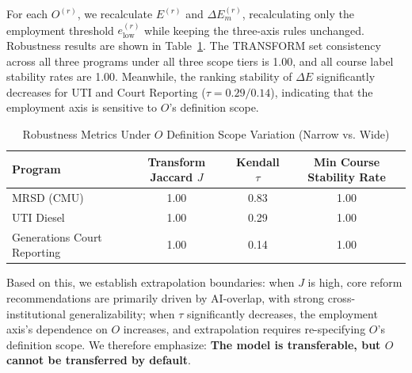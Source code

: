 For each $O^{(r)}$, we recalculate $E^{(r)}$ and $\Delta E_m^{(r)}$, recalculating only the employment threshold $e_{\mathrm{low}}^{(r)}$ while keeping the three-axis rules unchanged. Robustness results are shown in Table~\ref{tab:o_variants_robustness}. The TRANSFORM set consistency across all three programs under all three scope tiers is 1.00, and all course label stability rates are 1.00. Meanwhile, the ranking stability of $\Delta E$ significantly decreases for UTI and Court Reporting ($\tau=0.29/0.14$), indicating that the employment axis is sensitive to $O$'s definition scope.

\begin{table}[H]
\centering
\caption{Robustness Metrics Under $O$ Definition Scope Variation (Narrow vs. Wide)}
\label{tab:o_variants_robustness}
\begin{tabular}{@{}lccc@{}}
\toprule
Program & Transform Jaccard $J$ & Kendall $\tau$ & Min Course Stability Rate \\
\midrule
MRSD (CMU) & 1.00 & 0.83 & 1.00 \\
UTI Diesel & 1.00 & 0.29 & 1.00 \\
Generations Court Reporting & 1.00 & 0.14 & 1.00 \\
\bottomrule
\end{tabular}
\end{table}

Based on this, we establish extrapolation boundaries: when $J$ is high, core reform recommendations are primarily driven by AI-overlap, with strong cross-institutional generalizability; when $\tau$ significantly decreases, the employment axis's dependence on $O$ increases, and extrapolation requires re-specifying $O$'s definition scope. We therefore emphasize: \textbf{The model is transferable, but $O$ cannot be transferred by default}.
